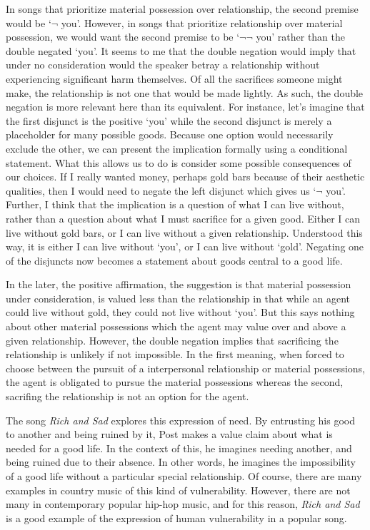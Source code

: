 \documentclass[
  12pt,
]{book}
\theoremstyle{definition}
\theoremstyle{definition}
\theoremstyle{definition}
\theoremstyle{definition}
\theoremstyle{remark}
\begin{document}
In songs that prioritize material possession over relationship, the second premise would be `\(\lnot\) you'. However, in songs that prioritize relationship over material possession, we would want the second premise to be `\(\lnot \lnot\) you' rather than the double negated `you'. It seems to me that the double negation would imply that under no consideration would the speaker betray a relationship without experiencing significant harm themselves. Of all the sacrifices someone might make, the relationship is not one that would be made lightly. As such, the double negation is more relevant here than its equivalent. For instance, let's imagine that the first disjunct is the positive `you' while the second disjunct is merely a placeholder for many possible goods. Because one option would necessarily exclude the other, we can present the implication formally using a conditional statement. What this allows us to do is consider some possible consequences of our choices. If I really wanted money, perhaps gold bars because of their aesthetic qualities, then I would need to negate the left disjunct which gives us `\(\lnot\) you'. Further, I think that the implication is a question of what I can live without, rather than a question about what I must sacrifice for a given good. Either I can live without gold bars, or I can live without a given relationship. Understood this way, it is either I can live without `you', or I can live without `gold'. Negating one of the disjuncts now becomes a statement about goods central to a good life.

In the later, the positive affirmation, the suggestion is that material possession under consideration, is valued less than the relationship in that while an agent could live without gold, they could not live without `you'. But this says nothing about other material possessions which the agent may value over and above a given relationship. However, the double negation implies that sacrificing the relationship is unlikely if not impossible. In the first meaning, when forced to choose between the pursuit of a interpersonal relationship or material possessions, the agent is obligated to pursue the material possessions whereas the second, sacrifing the relationship is not an option for the agent.

The song \emph{Rich and Sad} explores this expression of need. By entrusting his good to another and being ruined by it, Post makes a value claim about what is needed for a good life. In the context of this, he imagines needing another, and being ruined due to their absence. In other words, he imagines the impossibility of a good life without a particular special relationship. Of course, there are many examples in country music of this kind of vulnerability. However, there are not many in contemporary popular hip-hop music, and for this reason, \emph{Rich and Sad} is a good example of the expression of human vulnerability in a popular song.
\end{document}
